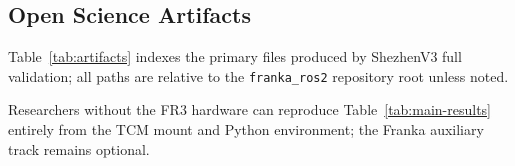 \subsection{Open Science Artifacts}
\label{sec:artifacts}

Table~\ref{tab:artifacts} indexes the primary files produced by ShezhenV3 full validation; all paths are relative to the \texttt{franka\_ros2} repository root unless noted.

\begin{table}[t]
\centering
\caption{Open science artifact index (Paper~I, TCM full run).}
\label{tab:artifacts}
\scriptsize
{}
\end{table}

Researchers without the FR3 hardware can reproduce Table~\ref{tab:main-results} entirely from the TCM mount and Python environment; the Franka auxiliary track remains optional.

